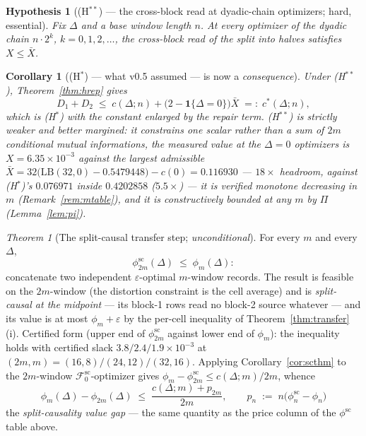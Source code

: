 \documentclass[11pt]{article}
\newtheorem{hypothesis}{Hypothesis}
\newtheorem{corollary}{Corollary}
\theoremstyle{definition}
\theoremstyle{remark}
\newtheorem{namedthm}{Theorem}
\begin{document}
\begin{hypothesis}[(H$^{\ast\ast}$) --- the cross-block read at
dyadic-chain optimizers; hard, essential]
\label{hyp:hstarstar}
Fix $\Delta$ and a base window length $n$. At every optimizer of the
dyadic chain $n\cdot2^k$, $k=0,1,2,\dots$, the cross-block read of the
split into halves satisfies $X\le\bar X$.
\end{hypothesis}

\begin{corollary}[(H$^\ast$) --- what v0.5 assumed --- is now a
\emph{consequence}]
\label{cor:hstar}
Under (H$^{\ast\ast}$), Theorem~\ref{thm:hrep} gives
\[
D_1+D_2\;\le\;c(\Delta;n)+\bigl(2-\mathbf 1\{\Delta=0\}\bigr)\bar X
\;=:\;c^\ast(\Delta;n) ,
\]
which is (H$^\ast$) with the constant enlarged by the repair term.
(H$^{\ast\ast}$) is \emph{strictly weaker and better margined}: it
constrains \emph{one scalar} rather than a sum of $2m$ conditional
mutual informations, the measured value at the $\Delta=0$ optimizers is
$X=6.35\times10^{-3}$ against the largest admissible
$\bar X=32\bigl(\mathrm{LB}(32,0)-0.5479448\bigr)-c(0)=0.116930$ ---
$18\times$ headroom, against (H$^\ast$)'s $0.076971$ inside $0.4202858$
($5.5\times$) --- it is verified \emph{monotone decreasing} in $m$
(Remark~\ref{rem:mtable}), and it is constructively bounded at any $m$
by $\Pi$ (Lemma~\ref{lem:pi}).
\end{corollary}

\begin{namedthm}[The split-causal transfer step; \emph{unconditional}]
\label{thm:scstep}
For every $m$ and every $\Delta$,
\[
\phi^{\mathrm{sc}}_{2m}(\Delta)\;\le\;\phi_m(\Delta) :
\]
concatenate two independent $\varepsilon$-optimal $m$-window records.
The result is feasible on the $2m$-window (the distortion constraint is
the cell average) and is \emph{split-causal at the midpoint} --- its
block-1 rows read no block-2 source whatever --- and its value is at
most $\phi_m+\varepsilon$ by the per-cell inequality of
Theorem~\ref{thm:transfer}(i). Certified form (upper end of
$\phi^{\mathrm{sc}}_{2m}$ against lower end of $\phi_m$): the
inequality holds with certified slack
$3.8/2.4/1.9\times10^{-3}$ at $(2m,m)=(16,8)/(24,12)/(32,16)$.
Applying Corollary~\ref{cor:scthm} to the $2m$-window
$\mathcal F_0^{\mathrm{sc}}$-optimizer gives
$\phi_m-\phi^{\mathrm{sc}}_{2m}\le c(\Delta;m)/2m$, whence
\[
\phi_m(\Delta)-\phi_{2m}(\Delta)\;\le\;
\frac{c(\Delta;m)+p_{2m}}{2m},
\qquad
p_n\;:=\;n\bigl(\phi^{\mathrm{sc}}_n-\phi_n\bigr)
\]
the \emph{split-causality value gap} --- the same quantity as the
price column of the $\phi^{\mathrm{sc}}$ table above.
\end{namedthm}
\end{document}
